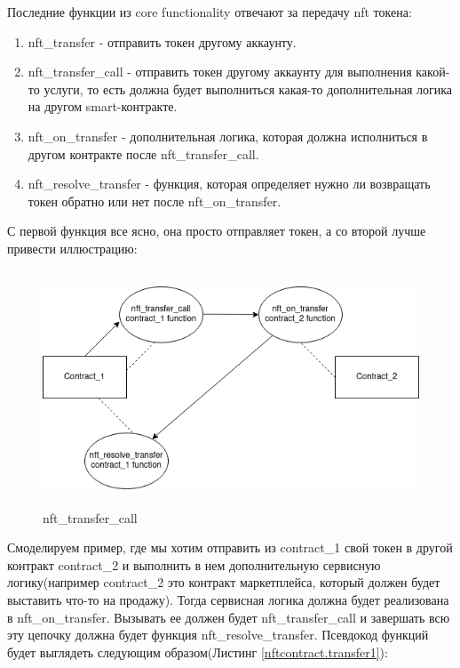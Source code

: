 Последние функции из core functionality отвечают за передачу nft токена:
\begin{enumerate}
\item nft\_transfer - отправить токен другому аккаунту.
\item nft\_transfer\_call - отправить токен другому аккаунту для выполнения какой-то услуги, то есть должна будет выполниться какая-то дополнительная логика на другом smart-контракте.
\item nft\_on\_transfer - дополнительная логика, которая должна исполниться в другом контракте после nft\_transfer\_call.
\item nft\_resolve\_transfer - функция, которая определяет нужно ли возвращать токен обратно или нет после nft\_on\_transfer.
\end{enumerate}
С первой функция все ясно, она просто отправляет токен, а со второй лучше привести иллюстрацию:

\begin{figure}[H]
	\centering
	\includegraphics[height=70mm]{fig/temp.png}
	\caption{nft\_transfer\_call}
\end{figure}

Смоделируем пример, где мы хотим отправить из contract\_1 свой токен в другой контракт contract\_2 и выполнить в нем дополнительную сервисную логику(например contract\_2 это контракт маркетплейса, который должен будет выставить что-то на продажу).
Тогда сервисная логика должна будет реализована в nft\_on\_transfer. Вызывать ее должен будет nft\_transfer\_call и завершать всю эту цепочку должна будет функция nft\_resolve\_transfer.
Псевдокод функций будет выглядеть следующим образом(Листинг {\color{blue}\ref{nftcontract.transfer1}}):

